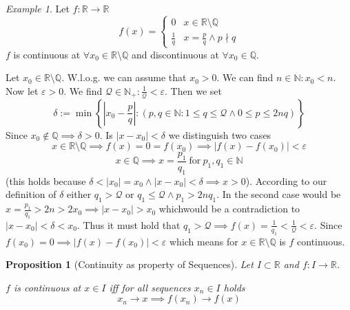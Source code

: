 \documentclass[english,titlepage]{uzhpub}
\theoremstyle{definition}
\theoremstyle{plain}
\newtheorem{proposition}[definition]{Proposition}
\theoremstyle{remark}
\theoremstyle{example}
\newtheorem*{example}{Example}
\begin{document}
   \begin{example}
      Let \(f: \mathbb{R} \to \mathbb{R}\)
      \[f(x) = \begin{cases}0 & x \in \mathbb{R}\setminus \mathbb{Q}\\ \frac{1}{q} & x = \frac{p}{q} \land p \nmid q\end{cases}\]
      \(f\) is continuous at \(\forall x_0 \in \mathbb{R}\setminus\mathbb{Q}\) and discontinuous at \(\forall x_0 \in \mathbb{Q}\).

      Let \(x_0 \in \mathbb{R} \setminus \mathbb{Q}\).
      W.l.o.g. we can assume that \(x_0 > 0\).
      We can find \(n \in \mathbb{N}: x_0 < n\).
      Now let \(\varepsilon > 0\).
      We find \(\mathcal{Q} \in \mathbb{N}_+: \frac{1}{\mathcal{Q}} < \varepsilon\).
      Then we set
      \[\delta := \min\left\{\left|x_0 - \frac{p}{q}\right|: (p, q \in \mathbb{N}: 1 \leq q \leq \mathcal{Q} \land 0 \leq p \leq 2nq)\right\}\]
      Since \(x_0 \not\in \mathbb{Q} \implies \delta > 0\).
      Is \(|x-x_0|< \delta\) we distinguish two cases
      \[x \in \mathbb{R} \setminus \mathbb{Q} \implies f(x) = 0 = f(x_0) \implies |f(x) - f(x_0)| < \varepsilon\]
      \[x \in \mathbb{Q} \implies x = \frac{p_1}{q_1}~\text{for}~p_1, q_1 \in \mathbb{N}\]
      (this holds because \(\delta < |x_0| = x_0 \land |x-x_0| < \delta \implies x > 0\)).
      According to our definition of \(\delta\) either \(q_1 > \mathcal{Q}\) or \(q_1 \leq \mathcal{Q} \land p_1 > 2nq_1\).
      In the second case would be \(x = \frac{p_1}{q_1} > 2n > 2x_0 \implies |x-x_0| > x_0\) whichwould be a contradiction to \(|x-x_0| < \delta < x_0\).
      Thus it must hold that \(q_1 > \mathcal{Q} \implies f(x) = \frac{1}{q_1} < \frac{1}{\mathcal{Q}} < \varepsilon\).
      Since \(f(x_0) = 0 \implies |f(x) - f(x_0)| < \varepsilon\) which means for \(x \in \mathbb{R} \setminus \mathbb{Q}\) is \(f\) continuous.
   \end{example}

   \begin{proposition}[Continuity as property of Sequences]\label{pro:image_of_seq_conv}
      Let \(I \subset \mathbb{R}\) and \(f: I \to \mathbb{R}\).

      \(f\) is continuous at \(x \in I\) iff for all sequences \(x_n \in I\) holds
      \[x_n \to x \implies f(x_n) \to f(x)\]
   \end{proposition}
\end{document}
